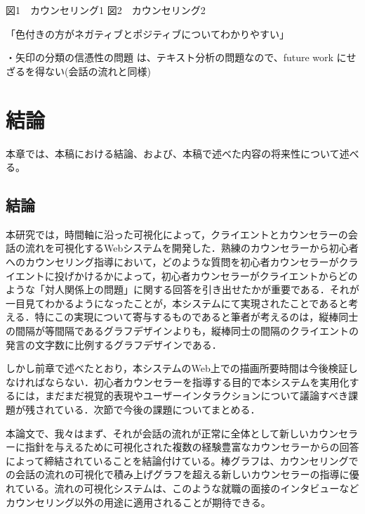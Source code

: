 \documentclass[shuuron]{kuee}
\begin{document}
  図1　カウンセリング1
  図2　カウンセリング2

  「色付きの方がネガティブとポジティブについてわかりやすい」

・矢印の分類の信憑性の問題
は、テキスト分析の問題なので、future work にせざるを得ない(会話の流れと同様)

\chapter{結論}

本章では、本稿における結論、および、本稿で述べた内容の将来性について述べる。

\section{結論}

本研究では，時間軸に沿った可視化によって，クライエントとカウンセラーの会話の流れを可視化するWebシステムを開発した．熟練のカウンセラーから初心者へのカウンセリング指導において，どのような質問を初心者カウンセラーがクライエントに投げかけるかによって，初心者カウンセラーがクライエントからどのような「対人関係上の問題」に関する回答を引き出せたかが重要である．それが一目見てわかるようになったことが，本システムにて実現されたことであると考える．特にこの実現について寄与するものであると筆者が考えるのは，縦棒同士の間隔が等間隔であるグラフデザインよりも，縦棒同士の間隔のクライエントの発言の文字数に比例するグラフデザインである．

しかし前章で述べたとおり，本システムのWeb上での描画所要時間は今後検証しなければならない．初心者カウンセラーを指導する目的で本システムを実用化するには，まだまだ視覚的表現やユーザーインタラクションについて議論すべき課題が残されている．次節で今後の課題についてまとめる．



本論文で、我々はまず、それが会話の流れが正常に全体として新しいカウンセラーに指針を与えるために可視化された複数の経験豊富なカウンセラーからの回答によって締結されていることを結論付けている。棒グラフは、カウンセリングでの会話の流れの可視化で積み上げグラフを超える新しいカウンセラーの指導に優れている。流れの可視化システムは、このような就職の面接のインタビューなどカウンセリング以外の用途に適用されることが期待できる。
\end{document}

